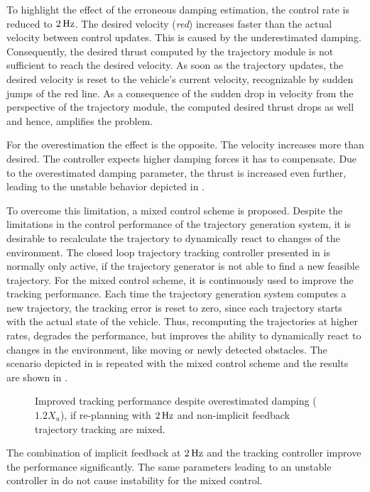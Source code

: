 To highlight the effect of the erroneous damping estimation, the control rate is reduced to $\unit[2]{Hz}$. The desired velocity (\emph{red}) increases faster than the actual velocity between control updates.
This is caused by the underestimated damping. Consequently, the desired thrust computed by the trajectory module is not sufficient to reach the desired velocity.
As soon as the trajectory updates, the desired velocity is reset to the vehicle's current velocity, recognizable by sudden jumps of the red line.
As a consequence of the sudden drop in velocity from the perspective of the trajectory module, the computed desired thrust drops as well and hence, amplifies the problem.

 For the overestimation the effect is the opposite. The velocity increases more than desired.
The controller expects higher damping forces it has to compensate.
Due to the overestimated damping parameter, the thrust is increased even further, leading to the unstable behavior depicted in .

To overcome this limitation, a mixed control scheme is proposed. Despite the limitations in the control performance of the trajectory generation system, it is desirable to recalculate the trajectory to dynamically react to changes of the environment.
The closed loop trajectory tracking controller presented in  is normally only active, if the trajectory generator is not able to find a new feasible trajectory. For the mixed control scheme, it is continuously used to improve the tracking performance. Each time the trajectory generation system computes a new trajectory, the tracking error is reset to zero, since each trajectory starts with the actual state of the vehicle. Thus, recomputing the trajectories at higher rates, degrades the performance, but improves the ability to dynamically react to changes in the environment, like moving or newly detected obstacles. The scenario depicted in  is repeated with the mixed control scheme and the results are shown in .
\begin{figure}
	\centering
	
	\caption{Improved tracking performance despite overestimated damping ($1.2 X_u$), if re-planning with $\unit[2]{Hz}$ and non-implicit feedback trajectory tracking are mixed.}
    \label{fig:improved-performance-mixed-control}
\end{figure}
The combination of implicit feedback at $\unit[2]{Hz}$ and the tracking controller improve the performance significantly. The same parameters leading to an unstable controller in  do not cause instability for the mixed control.

